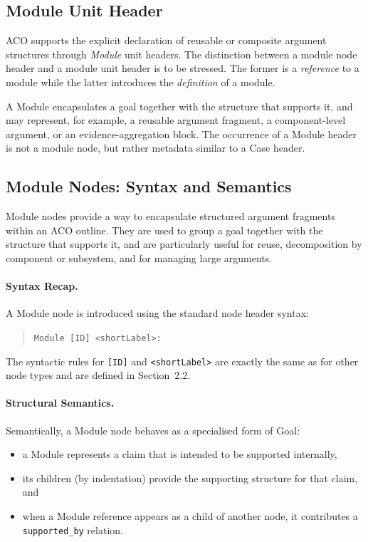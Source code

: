 \documentclass[11pt,twoside,a4paper]{article}
\begin{document}
\subsection{Module Unit Header}

ACO supports the explicit declaration of reusable or composite argument structures through
\emph{Module} unit headers.
The distinction between a module node header and a module unit header is to be stressed. The former is a \emph{reference} to a module while the latter introduces the \emph{definition} of a module.

A Module encapsulates a goal together with the structure that supports it,
and may represent, for example, a reusable argument fragment, a component-level argument,
or an evidence-aggregation block.
The occurrence of a Module header is not a module node, but rather metadata similar to a Case header.
%

\subsection{Module Nodes: Syntax and Semantics}
\label{sec:module-semantics}

Module nodes provide a way to encapsulate structured argument fragments within an
ACO outline. They are used to group a goal together with the structure that supports
it, and are particularly useful for reuse, decomposition by component or subsystem,
and for managing large arguments.

\paragraph{Syntax Recap.}
A Module node is introduced using the standard node header syntax:
\begin{quote}
\texttt{Module [ID] \textless shortLabel\textgreater:}
\end{quote}
The syntactic rules for \texttt{[ID]} and \texttt{\textless shortLabel\textgreater{}}
are exactly the same as for other node types and are defined in Section~2.2.

\paragraph{Structural Semantics.}
Semantically, a Module node behaves as a specialised form of Goal:
\begin{itemize}[leftmargin=2em]
  \item a Module represents a claim that is intended to be supported internally,
  \item its children (by indentation) provide the supporting structure for that claim, and
  \item when a Module reference appears as a child of another node, it contributes a
        \texttt{supported\_by} relation.
\end{itemize}
\end{document}
